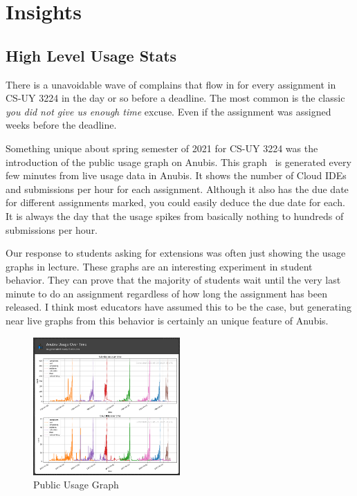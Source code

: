 \chapter{Insights}\label{ch:insights}

\section{High Level Usage Stats}\label{sec:high-level-usage-stats}

There is a unavoidable wave of complains that flow in for every assignment in CS-UY 3224
in the day or so before a deadline.
The most common is the classic \textit{you did not give us enough time} excuse.
Even if the assignment was assigned weeks before the deadline.

Something unique about spring semester of 2021 for CS-UY 3224 was the introduction of the public usage graph on Anubis.
This graph~ is generated every few minutes from live usage data in Anubis.
It shows the number of Cloud IDEs and submissions per hour for each assignment.
Although it also has the due date for different assignments marked, you could easily deduce the
due date for each.
It is always the day that the usage spikes from basically nothing to hundreds of submissions per hour.

Our response to students asking for extensions was often just showing the usage graphs in lecture.
These graphs are an interesting experiment in student behavior.
They can prove that the majority of students wait until the very last minute to do an assignment
regardless of how long the assignment has been released.
I think most educators have assumed this to be the case, but generating near live graphs from 
this behavior is certainly an unique feature of Anubis.  

\begin{figure}[ht]
    \centering
    \includegraphics[width=0.5\textwidth]{figures/public-usage-1}
    \caption{Public Usage Graph\label{fig:public-usage}}
\end{figure}

